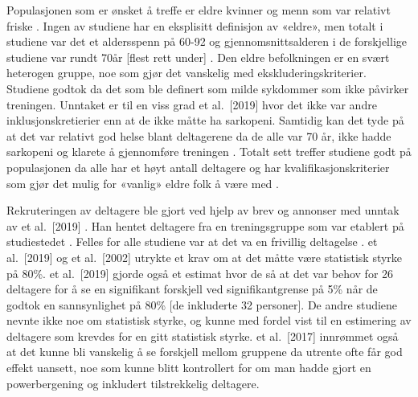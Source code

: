 \documentclass[
]{book}
\begin{document}
Populasjonen som er ønsket å treffe er eldre kvinner og menn som var relativt friske \citetext{\citealp[ et al.~2012]{Geirsdottir}; \citealp[Johnen, and Holfelder 2019]{Schott}; \citealp[ et al.~2017]{Turpela}; \citealp[ et al.~2019]{vikberg}; \citealp[ et al.~2002]{vincent}}.
Ingen av studiene har en eksplisitt definisjon av «eldre», men totalt i studiene var det et aldersspenn på 60-92 og gjennomsnittsalderen i de forskjellige studiene var rundt 70år {[}flest rett under{]} \citetext{\citealp[ et al.~2012]{Geirsdottir}; \citealp[Johnen, and Holfelder 2019]{Schott}; \citealp[ et al.~2017]{Turpela}; \citealp[ et al.~2019]{vikberg}; \citealp[ et al.~2002]{vincent}}.
Den eldre befolkningen er en svært heterogen gruppe, noe som gjør det vanskelig med ekskluderingskriterier.
Studiene godtok da det som ble definert som milde sykdommer som ikke påvirker treningen.
Unntaket er til en viss grad \citet{vikberg} et al.~{[}2019{]} hvor det ikke var andre inklusjonskretierier enn at de ikke måtte ha sarkopeni.
Samtidig kan det tyde på at det var relativt god helse blant deltagerene da de alle var 70 år, ikke hadde sarkopeni og klarete å gjennomføre treningen \citep[ et al.~2019]{vikberg}.
Totalt sett treffer studiene godt på populasjonen da alle har et høyt antall deltagere og har kvalifikasjonskriterier som gjør det mulig for «vanlig» eldre folk å være med \citetext{\citealp[ et al.~2012]{Geirsdottir}; \citealp[Johnen, and Holfelder 2019]{Schott}; \citealp[ et al.~2017]{Turpela}; \citealp[ et al.~2019]{vikberg}; \citealp[ et al.~2002]{vincent}}.

Rekruteringen av deltagere ble gjort ved hjelp av brev og annonser med unntak av \citet{Schott} et al.~{[}2019{]} \citetext{\citealp[ et al.~2012]{Geirsdottir}; \citealp[ et al.~2017]{Turpela}; \citealp[ et al.~2019]{vikberg}; \citealp[ et al.~2002]{vincent}}.
Han hentet deltagere fra en treningsgruppe som var etablert på studiestedet \citep[Johnen, and Holfelder 2019]{Schott}.
Felles for alle studiene var at det va en frivillig deltagelse \citetext{\citealp[ et al.~2012]{Geirsdottir}; \citealp[Johnen, and Holfelder 2019]{Schott}; \citealp[ et al.~2017]{Turpela}; \citealp[ et al.~2019]{vikberg}; \citealp[ et al.~2002]{vincent}}.
\citet{Schott} et al.~{[}2019{]} og \citet{vincent} et al.~{[}2002{]} utrykte et krav om at det måtte være statistisk styrke på 80\%.
\citet{Schott} et al.~{[}2019{]} gjorde også et estimat hvor de så at det var behov for 26 deltagere for å se en signifikant forskjell ved signifikantgrense på 5\% når de godtok en sannsynlighet på 80\% {[}de inkluderte 32 personer{]}.
De andre studiene nevnte ikke noe om statistisk styrke, og kunne med fordel vist til en estimering av deltagere som krevdes for en gitt statistisk styrke.
\citet{Turpela} et al.~{[}2017{]} innrømmet også at det kunne bli vanskelig å se forskjell mellom gruppene da utrente ofte får god effekt uansett, noe som kunne blitt kontrollert for om man hadde gjort en powerbergening og inkludert tilstrekkelig deltagere.
\end{document}
